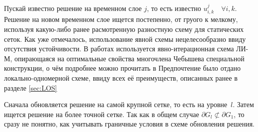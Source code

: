Пускай известно решение на временном слое $j$, то есть известно $u_{i, k}^{j} \quad \forall i, k$.
Решение на новом временном слое ищется постепенно, от груого к мелкому, используя какую-либо ранее расмотренную разностную схему для статических сеток.
Как уже отмечалось, использование явной схемы нецелесообразно ввиду отсутствия устойчивости.
В работах \cite{жуков2015численное} используется явно-итерационная схема ЛИ-М, опирающаяся на оптимальные свойства многочлена Чебышева специальной конструкции, о чём подробнее можно прочитать в \cite{жуков2010явных, жуков2015решении, жуков2014параллельный}
Предпочтение было отдано локально-одномерной схеме, ввиду всех её преимуществ, описанных ранее в разделе \ref{sec:LOS}

Сначала обновляется решение на самой крупной сетке, то есть на уровне~$l$.
Затем ищется решение на более точной сетке. 
Так как в общем случае $\partial G_l \not\subset \partial G_1$, то сразу не понятно, как учитывать граничные условия в схеме обновления решения.